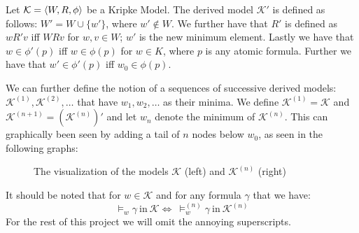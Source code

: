 \documentclass[../main.tex]{subfiles}
\begin{document}
\begin{defi}
	Let $\mathcal{K}=\langle W,R,\phi\rangle$ be a Kripke Model. The derived model
	$\mathcal{K'}$ is defined as follows: $W'=W\cup \{w'\}$, where
	$w'\not\in W$. We further have that $R'$ is defined as $wR'v$ iff $WRv$
	for $w,v\in W$; $w'$ is the new minimum element. Lastly we have that
	$w\in\phi'(p)$ iff $w\in\phi(p)$ for $w\in K$, where $p$ is any atomic
	formula. Further we have that $w'\in\phi'(p)$ iff $w_0\in\phi(p)$.
\end{defi}
We can further define the notion of a sequences of successive derived models:
$\mathcal{K}^{(1)},\mathcal{K}^{(2)},\ldots$ that have $w_1,w_2,\ldots$ as
their minima. We define $\mathcal{K}^{(1)}=\mathcal{K}$ and
$\mathcal{K}^{(n+1)}=(\mathcal{K}^{(n)})'$ and let $w_n$ denote the minimum of
$\mathcal{K}^{(n)}$. This can graphically been seen by adding a tail of $n$
nodes below $w_0$, as seen in the following graphs:


\begin{figure}[h]
	\begin{center}
\qquad
\qquad
{}
\end{center}
\caption{The visualization of the models $\mathcal{K}$ (left) and
$\mathcal{K}^{(n)}$ (right)}
\end{figure}


It should be noted that for $w\in\mathcal{K}$ and for any formula $\gamma$
that we have:
$$\vDash_w\gamma\ \text{in}\ \mathcal{K}\Leftrightarrow\ \vDash_w^{(n)}\gamma\
\text{in}\ \mathcal{K}^{(n)}$$
For the rest of this project we will omit the annoying superscripts.
\end{document}
